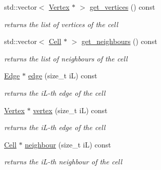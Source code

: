 \begin{DoxyCompactItemize}
\mbox{\label{classHArDCore2D_1_1Cell_a19a14fe5dd32fbf9d9557aaece6a0499}} 
std\+::vector$<$ \hyperlink{classHArDCore2D_1_1Vertex}{Vertex} $\ast$ $>$ \hyperlink{classHArDCore2D_1_1Cell_a19a14fe5dd32fbf9d9557aaece6a0499}{get\+\_\+vertices} () const
\begin{DoxyCompactList}\small\item\em returns the list of vertices of the cell \end{DoxyCompactList}\item 
\mbox{\label{classHArDCore2D_1_1Cell_a4d29dc1248424166380aa33d9ea7de3d}} 
std\+::vector$<$ \hyperlink{classHArDCore2D_1_1Cell}{Cell} $\ast$ $>$ \hyperlink{classHArDCore2D_1_1Cell_a4d29dc1248424166380aa33d9ea7de3d}{get\+\_\+neighbours} () const
\begin{DoxyCompactList}\small\item\em returns the list of neighbours of the cell \end{DoxyCompactList}\item 
\mbox{\label{classHArDCore2D_1_1Cell_a85defed1382a8af8227e89f00434603e}} 
\hyperlink{classHArDCore2D_1_1Edge}{Edge} $\ast$ \hyperlink{classHArDCore2D_1_1Cell_a85defed1382a8af8227e89f00434603e}{edge} (size\+\_\+t iL) const
\begin{DoxyCompactList}\small\item\em returns the i\+L-\/th edge of the cell \end{DoxyCompactList}\item 
\mbox{\label{classHArDCore2D_1_1Cell_a2e6bcdeac17fd028ef3892e7866c7b88}} 
\hyperlink{classHArDCore2D_1_1Vertex}{Vertex} $\ast$ \hyperlink{classHArDCore2D_1_1Cell_a2e6bcdeac17fd028ef3892e7866c7b88}{vertex} (size\+\_\+t iL) const
\begin{DoxyCompactList}\small\item\em returns the i\+L-\/th edge of the cell \end{DoxyCompactList}\item 
\mbox{\label{classHArDCore2D_1_1Cell_adddfffa330938bd8ab624349722a0e4e}} 
\hyperlink{classHArDCore2D_1_1Cell}{Cell} $\ast$ \hyperlink{classHArDCore2D_1_1Cell_adddfffa330938bd8ab624349722a0e4e}{neighbour} (size\+\_\+t iL) const
\begin{DoxyCompactList}\small\item\em returns the i\+L-\/th neighbour of the cell \end{DoxyCompactList}\item 

\end{DoxyCompactItemize}
